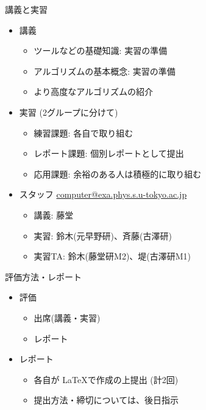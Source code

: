 \begin{frame}[t,fragile]{講義と実習}
  \begin{itemize}
  \item 講義
    \begin{itemize}
    \item ツールなどの基礎知識: 実習の準備
    \item アルゴリズムの基本概念: 実習の準備
    \item より高度なアルゴリズムの紹介
    \end{itemize}
  \item 実習 (2グループに分けて)
    \begin{itemize}
    \item 練習課題: 各自で取り組む
    \item レポート課題: 個別レポートとして提出
    \item 応用課題: 余裕のある人は積極的に取り組む
    \end{itemize}
  \item スタッフ \href{mailto:computer@exa.phys.s.u-tokyo.ac.jp}{computer@exa.phys.s.u-tokyo.ac.jp}
    \begin{itemize}
    \item 講義: 藤堂
    \item 実習: 鈴木(元早野研)、斉藤(古澤研)
    \item 実習TA: 鈴木(藤堂研M2)、堤(古澤研M1)
    \end{itemize}
  \end{itemize}    
\end{frame}

\begin{frame}[t,fragile]{評価方法・レポート}
  \begin{itemize}
  \item 評価
    \begin{itemize}
    \item 出席(講義・実習)
    \item レポート
    \end{itemize}    
  \item レポート
    \begin{itemize}
    \item 各自が \LaTeX で作成の上提出 (計2回)
    \item 提出方法・締切については、後日指示
    \end{itemize}
  \end{itemize}    
\end{frame}

